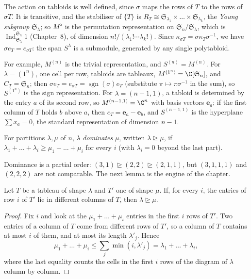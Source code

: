 The action on tabloids is well defined, since $\sigma$ maps the rows of $T$ to the rows of $\sigma T$. It is transitive, and the stabiliser of $\{T\}$ is $R_T\cong\mathfrak S_{\lambda_1}\times\dots\times\mathfrak S_{\lambda_k}$, the
\emph{Young subgroup} $\mathfrak S_\lambda$; so $M^\lambda$ is the permutation representation on $\mathfrak S_n/\mathfrak S_\lambda$, which is $\operatorname{Ind}_{\mathfrak S_\lambda}^{\mathfrak S_n}1$ (Chapter~8), of dimension $n!/(\lambda_1!\cdots\lambda_k!)$.
Since $\kappa_{\sigma T}=\sigma\kappa_T\sigma^{-1}$, we have $\sigma e_T=e_{\sigma T}$: the span $S^\lambda$ is a submodule, generated by any single polytabloid.

For example, $M^{(n)}$ is the trivial representation, and $S^{(n)}=M^{(n)}$. For $\lambda=(1^n)$, one cell per row, tabloids are tableaux, $M^{(1^n)}=\C[\mathfrak S_n]$, and $C_T=\mathfrak S_n$; then $\sigma e_T=e_{\sigma T}=\operatorname{sgn}(\sigma)e_T$ (substitute
$\pi\mapsto\pi\sigma^{-1}$ in the sum), so $S^{(1^n)}$ is the sign representation. For $\lambda=(n-1,1)$, a tabloid is determined by the entry $a$ of its second row, so $M^{(n-1,1)}=\C^n$ with basis vectors $\mathbf e_a$; if the first column of $T$ holds $b$
above $a$, then $e_T=\mathbf e_a-\mathbf e_b$, and $S^{(n-1,1)}$ is the hyperplane $\sum x_a=0$, the standard representation of dimension $n-1$.

\begin{definition}\label{def:dominance}
For partitions $\lambda,\mu$ of $n$, $\lambda$ \emph{dominates} $\mu$, written $\lambda\trianglerighteq\mu$, if $\lambda_1+\dots+\lambda_i\ge\mu_1+\dots+\mu_i$ for every $i$ (with $\lambda_i=0$ beyond the last part).
\end{definition}

Dominance is a partial order: $(3,1)\trianglerighteq(2,2)\trianglerighteq(2,1,1)$, but $(3,1,1,1)$ and $(2,2,2)$ are not comparable. The next lemma is the engine of the chapter.

\begin{lemma}\label{lem:dominance}
Let $T$ be a tableau of shape $\lambda$ and $T'$ one of shape $\mu$. If, for every $i$, the entries of row $i$ of $T'$ lie in different columns of $T$, then $\lambda\trianglerighteq\mu$.
\end{lemma}

\begin{proof}
Fix $i$ and look at the $\mu_1+\dots+\mu_i$ entries in the first $i$ rows of $T'$. Two entries of a column of $T$ come from different rows of $T'$, so a column of $T$ contains at most $i$ of them, and at most its length $\lambda'_j$.
Hence
\[
\mu_1+\dots+\mu_i\le\sum_j\min(i,\lambda'_j)=\lambda_1+\dots+\lambda_i,
\]
where the last equality counts the cells in the first $i$ rows of the diagram of $\lambda$ column by column.
\end{proof}

